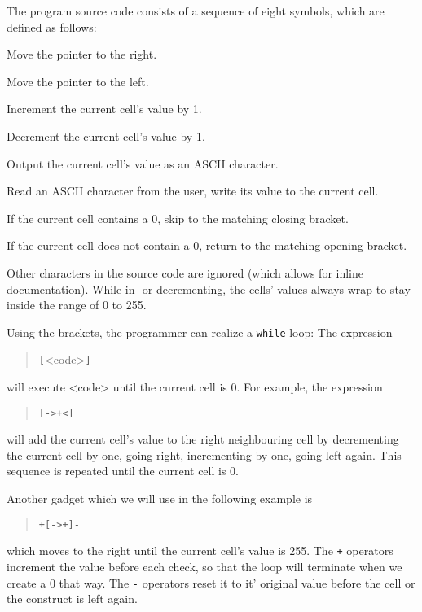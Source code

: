 The program source code consists of a sequence of eight symbols, which are defined as follows:

\begin{description}[labelsep=1em]
    \item[\texttt{>}] Move the pointer to the right.
    \item[\texttt{<}] Move the pointer to the left.
    \item[\texttt{+}] Increment the current cell's value by 1.
    \item[\texttt{-}] Decrement the current cell's value by 1.
    \item[\texttt{.}] Output the current cell's value as an ASCII character.
    \item[\texttt{,}] Read an ASCII character from the user, write its value to the current cell.
    \item[\texttt{[}] If the current cell contains a 0, skip to the matching closing bracket.
    \item[\texttt{]}] If the current cell does not contain a 0, return to the matching opening bracket.
\end{description}

Other characters in the source code are ignored (which allows for inline documentation). While in- or decrementing, the cells' values always wrap to stay inside the range of 0 to 255.

Using the brackets, the programmer can realize a \texttt{while}-loop: The expression

\begin{quotation}
    \texttt{[}<code>\texttt{]}
\end{quotation}

will execute <code> until the current cell is 0. For example, the expression

\begin{quotation}
    \texttt{[->+<]}
\end{quotation}

will add the current cell's value to the right neighbouring cell by decrementing the current cell by one, going right, incrementing by one, going left again. This sequence is repeated until the current cell is 0.

Another gadget which we will use in the following example is

\begin{quotation}
    \texttt{+[->+]-}
\end{quotation}

which moves to the right until the current cell's value is 255. The \texttt{+} operators increment the value before each check, so that the loop will terminate when we create a 0 that way. The \texttt{-} operators reset it to it' original value before the cell or the construct is left again.

